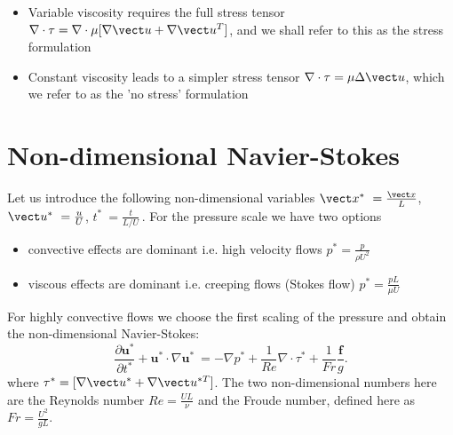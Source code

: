 \begin{itemize}
\item Variable viscosity requires the full stress tensor \(\nabla \cdot \tau=\nabla \cdot \mu[\nabla \vect u+\nabla \vect u^{T}]\), and we shall refer to this as the stress formulation
\item Constant viscosity leads to a simpler stress tensor \(\nabla \cdot \tau=\mu\Delta \vect u\), which we refer to as the 'no stress' formulation
\end{itemize}

\section{Non-dimensional Navier-Stokes}
Let us introduce the following non-dimensional variables \(\vect x^*\ = \frac{\vect x}{L}\), \(\vect u^*\ = \frac{u}{U}\), \(t^*\ = \frac{t}{L/U}\,\).
For the pressure scale we have two options 
\begin{itemize}
\item convective effects are dominant i.e. high velocity flows
\( p^* = \frac{p}{\rho U^2} \)
\item viscous effects are dominant i.e. creeping flows (Stokes flow)
\( p^* = \frac{p L}{\mu U} \)
\end{itemize}
For highly convective flows we choose the first scaling of the pressure and obtain the non-dimensional Navier-Stokes:
\begin{equation}\label{eq:NS_nondim}
\frac{\partial \mathbf{u^*}}{\partial t^*} + \mathbf{u^*} \cdot \nabla \mathbf{u^*}\ = -\nabla p^* + \frac{1}{Re} \nabla\cdot \tau^* + \frac{1}{Fr}\frac{\mathbf{f}}{g}.
\end{equation}
where \( \tau^*=[\nabla \vect u^*+\nabla \vect u^{*T}]\).
 The two non-dimensional numbers here are the Reynolds number \(Re=\frac{U L}{\nu}\) and the Froude number, defined here as \(Fr = \frac{U^2}{gL}\).
%
